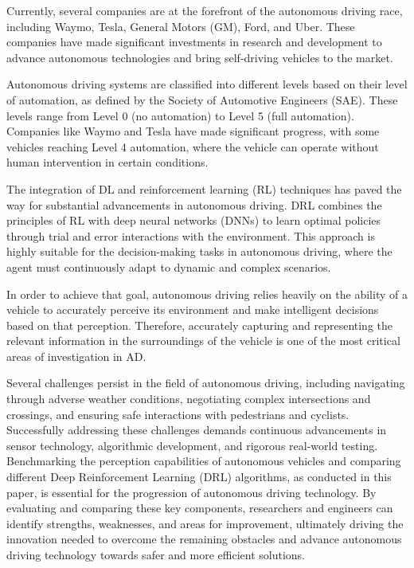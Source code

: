 \documentclass[conference]{IEEEtran}
\begin{document}
Currently, several companies are at the forefront of the autonomous driving race, including Waymo, Tesla, General Motors (GM), Ford, and Uber. These companies have made significant investments in research and development to advance autonomous technologies and bring self-driving vehicles to the market.

Autonomous driving systems are classified into different levels based on their level of automation, as defined by the Society of Automotive Engineers (SAE). These levels range from Level 0 (no automation) to Level 5 (full automation). Companies like Waymo and Tesla have made significant progress, with some vehicles reaching Level 4 automation, where the vehicle can operate without human intervention in certain conditions.

The integration of DL and reinforcement learning (RL) techniques has paved the way for substantial advancements in autonomous driving. DRL combines the principles of RL with deep neural networks (DNNs) to learn optimal policies through trial and error interactions with the environment. This approach is highly suitable for the decision-making tasks in autonomous driving, where the agent must continuously adapt to dynamic and complex scenarios. 

In order to achieve that goal, autonomous driving relies heavily on the ability of a vehicle to accurately perceive its environment and make intelligent decisions based on that perception. Therefore, accurately capturing and representing the relevant information in the surroundings of the vehicle is one of the most critical areas of investigation in AD.

Several challenges persist in the field of autonomous driving, including navigating through adverse weather conditions, negotiating complex intersections and crossings, and ensuring safe interactions with pedestrians and cyclists. Successfully addressing these challenges demands continuous advancements in sensor technology, algorithmic development, and rigorous real-world testing. Benchmarking the perception capabilities of autonomous vehicles and comparing different Deep Reinforcement Learning (DRL) algorithms, as conducted in this paper, is essential for the progression of autonomous driving technology. By evaluating and comparing these key components, researchers and engineers can identify strengths, weaknesses, and areas for improvement, ultimately driving the innovation needed to overcome the remaining obstacles and advance autonomous driving technology towards safer and more efficient solutions.
\end{document}
